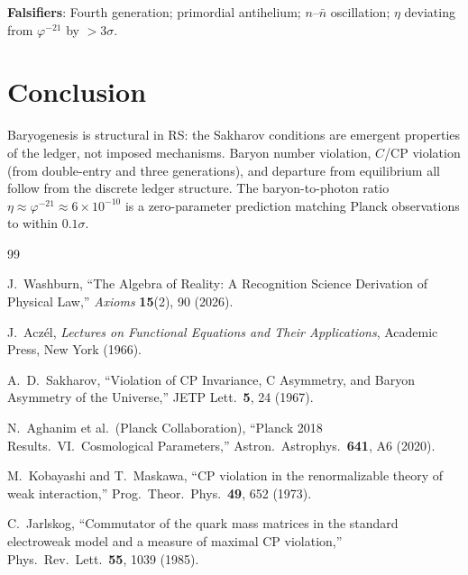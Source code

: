 \documentclass[12pt,a4paper]{article}
\theoremstyle{definition}
\theoremstyle{remark}
\begin{document}
\textbf{Falsifiers}: Fourth generation; primordial antihelium; $n$--$\bar{n}$
oscillation; $\eta$ deviating from $\varphi^{-21}$ by $> 3\sigma$.

\section{Conclusion}
\label{sec:conclusion}

Baryogenesis is structural in RS: the Sakharov conditions are
emergent properties of the ledger, not imposed mechanisms.  Baryon
number violation, $C$/CP violation (from double-entry and three
generations), and departure from equilibrium all follow from the
discrete ledger structure.  The baryon-to-photon ratio
$\eta \approx \varphi^{-21} \approx 6 \times 10^{-10}$ is a
zero-parameter prediction matching Planck observations to within
$0.1\sigma$.

\begin{thebibliography}{99}

J.~Washburn, ``The Algebra of Reality: A Recognition Science Derivation
of Physical Law,'' \emph{Axioms} \textbf{15}(2), 90 (2026).

J.~Acz\'el, \textit{Lectures on Functional Equations and Their Applications},
Academic Press, New York (1966).

A.~D.~Sakharov, ``Violation of CP Invariance, C Asymmetry, and
Baryon Asymmetry of the Universe,'' JETP Lett.\ \textbf{5}, 24
(1967).

N.~Aghanim et al.\ (Planck Collaboration), ``Planck 2018 Results.\ VI.\
Cosmological Parameters,'' Astron.\ Astrophys.\ \textbf{641}, A6
(2020).

M.~Kobayashi and T.~Maskawa, ``CP violation in the renormalizable
theory of weak interaction,'' Prog.\ Theor.\ Phys.\ \textbf{49}, 652
(1973).

C.~Jarlskog, ``Commutator of the quark mass matrices in the
standard electroweak model and a measure of maximal CP violation,''
Phys.\ Rev.\ Lett.\ \textbf{55}, 1039 (1985).

\end{thebibliography}
\end{document}
